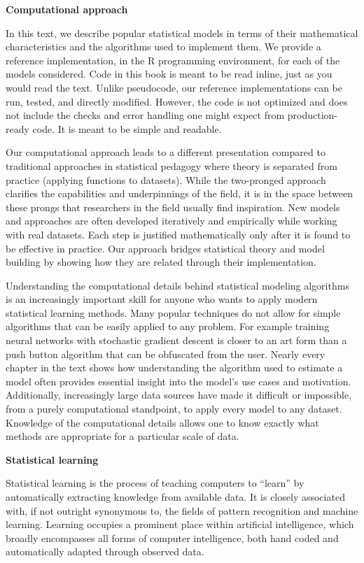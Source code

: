 \documentclass[12pt,hidelinks]{article}
\numberwithin{equation}{section}
\begin{document}
\textbf{Computational approach}

In this text, we describe popular statistical models in terms of
their mathematical characteristics and the algorithms used to
implement them. We provide a reference implementation, in the R programming
environment, for each of the models considered. Code in this book is meant to
be read inline, just as you would read the text. Unlike pseudocode, our
reference implementations can be run, tested, and directly modified. However,
the code is not optimized and does not include the checks and error handling
one might expect from production-ready code. It is meant to be simple and
readable.

Our computational approach leads to a different presentation compared to
traditional approaches in statistical pedagogy where theory is separated from
practice (applying functions to datasets). While
the two-pronged approach clarifies the capabilities and
underpinnings of the field, it is in the space between these prongs that
researchers in the field usually find inspiration.
New models and approaches are often developed iteratively and empirically
while working with real datasets. Each step is justified mathematically only
after it is found to be effective in practice. Our approach bridges
statistical theory and model building by showing how they are related
through their implementation.

Understanding the computational details behind statistical modeling algorithms
is an increasingly important skill for anyone who wants to apply modern
statistical learning methods. Many popular techniques do not
allow for simple algorithms that can be easily applied to any problem. For
example training neural networks with stochastic gradient
descent is closer to an art form than a push button algorithm that can
be obfuscated from the user. Nearly every chapter in the text shows how
understanding the algorithm used to estimate a model often provides essential
insight into the model's use cases and motivation. Additionally, increasingly
large data sources have made it difficult or impossible, from a purely
computational standpoint, to apply every model to any dataset. Knowledge of
the computational details allows one to know exactly what methods are
appropriate for a particular scale of data.

\vspace{12pt}
\textbf{Statistical learning}

Statistical learning is the process of teaching computers to ``learn'' by
automatically extracting knowledge from available data. It is closely
associated with, if not outright synonymous to, the fields of pattern
recognition and machine learning. Learning occupies a prominent place within
artificial intelligence, which broadly encompasses all forms of computer
intelligence, both hand coded and automatically adapted through observed data.
\end{document}
